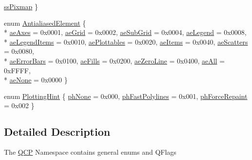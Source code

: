 \begin{DoxyCompactItemize}
\hyperlink{namespaceQCP_af66d0711d42fe78d96c28abadc67f26fa3046d385199d0903dd492322ba133e75}{ss\-Pixmap}
 \}
\item 
enum \hyperlink{namespaceQCP_ae55dbe315d41fe80f29ba88100843a0c}{Antialiased\-Element} \{ \\*
\hyperlink{namespaceQCP_ae55dbe315d41fe80f29ba88100843a0caefa92e89cd37f8a081fd2075aa1af73f}{ae\-Axes} = 0x0001, 
\hyperlink{namespaceQCP_ae55dbe315d41fe80f29ba88100843a0ca4fbb37118d62288af0ca601ff2b07a2f}{ae\-Grid} = 0x0002, 
\hyperlink{namespaceQCP_ae55dbe315d41fe80f29ba88100843a0caaedf83369188a15a69f92bb1d85ca97b}{ae\-Sub\-Grid} = 0x0004, 
\hyperlink{namespaceQCP_ae55dbe315d41fe80f29ba88100843a0ca9e0127a6361b5d0596b031a482c5cf97}{ae\-Legend} = 0x0008, 
\\*
\hyperlink{namespaceQCP_ae55dbe315d41fe80f29ba88100843a0ca1aca7a50c1b95403958733a4acafe773}{ae\-Legend\-Items} = 0x0010, 
\hyperlink{namespaceQCP_ae55dbe315d41fe80f29ba88100843a0ca4145e4251b0cf2dbedabeea0a38f84f6}{ae\-Plottables} = 0x0020, 
\hyperlink{namespaceQCP_ae55dbe315d41fe80f29ba88100843a0caf7712a85d6b0c75b24301d2fe9484db3}{ae\-Items} = 0x0040, 
\hyperlink{namespaceQCP_ae55dbe315d41fe80f29ba88100843a0cae45ed8cd167bffe27d7f40da4bc17e9c}{ae\-Scatters} = 0x0080, 
\\*
\hyperlink{namespaceQCP_ae55dbe315d41fe80f29ba88100843a0ca9dcf3882cb321bb305f71fdc0f09f63d}{ae\-Error\-Bars} = 0x0100, 
\hyperlink{namespaceQCP_ae55dbe315d41fe80f29ba88100843a0ca788810f0aa930137de6ad6cc6d83d354}{ae\-Fills} = 0x0200, 
\hyperlink{namespaceQCP_ae55dbe315d41fe80f29ba88100843a0ca261f8ea78cf3c9561726223ffa33dc12}{ae\-Zero\-Line} = 0x0400, 
\hyperlink{namespaceQCP_ae55dbe315d41fe80f29ba88100843a0caa897c232a0ffc8368e7c100ffc59ef31}{ae\-All} = 0x\-F\-F\-F\-F, 
\\*
\hyperlink{namespaceQCP_ae55dbe315d41fe80f29ba88100843a0caa9e90d81896358757d94275aeaa58f6a}{ae\-None} = 0x0000
 \}
\item 
enum \hyperlink{namespaceQCP_a5400e5fcb9528d92002ddb938c1f4ef4}{Plotting\-Hint} \{ \hyperlink{namespaceQCP_a5400e5fcb9528d92002ddb938c1f4ef4ab7283c5bfc1ba9e597015389880bda42}{ph\-None} = 0x000, 
\hyperlink{namespaceQCP_a5400e5fcb9528d92002ddb938c1f4ef4aa5fd227bc878c56ad2a87ea32c74ee4d}{ph\-Fast\-Polylines} = 0x001, 
\hyperlink{namespaceQCP_a5400e5fcb9528d92002ddb938c1f4ef4aa3090dafa0e0f9a28c579c79d6c2d283}{ph\-Force\-Repaint} = 0x002
 \}
\end{DoxyCompactItemize}


\subsection{Detailed Description}
The \hyperlink{namespaceQCP}{Q\-C\-P} Namespace contains general enums and Q\-Flags 

